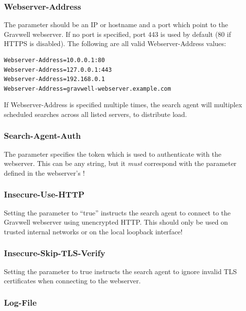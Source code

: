 \subsubsection{Webserver-Address}

The  parameter should be an IP or hostname and a
port which point to the Gravwell webserver. If no port is specified,
port 443 is used by default (80 if HTTPS is disabled). The following are
all valid Webserver-Address values:

\begin{Verbatim}[breaklines=true]
Webserver-Address=10.0.0.1:80
Webserver-Address=127.0.0.1:443
Webserver-Address=192.168.0.1
Webserver-Address=gravwell-webserver.example.com
\end{Verbatim}

If Webserver-Address is specified multiple times, the search agent will multiplex
scheduled searches across all listed servers, to distribute load.

\subsubsection{Search-Agent-Auth}

The  parameter specifies the token which is used to
authenticate with the webserver. This can be any string, but it
\emph{must} correspond with the  parameter defined in
the webserver's !

\subsubsection{Insecure-Use-HTTP}

Setting the  parameter to ``true'' instructs the
search agent to connect to the Gravwell webserver using unencrypted
HTTP. This should only be used on trusted internal networks or on the
local loopback interface!

\subsubsection{Insecure-Skip-TLS-Verify}

Setting the  parameter to true instructs
the search agent to ignore invalid TLS certificates when connecting to
the webserver.

\subsubsection{Log-File}

